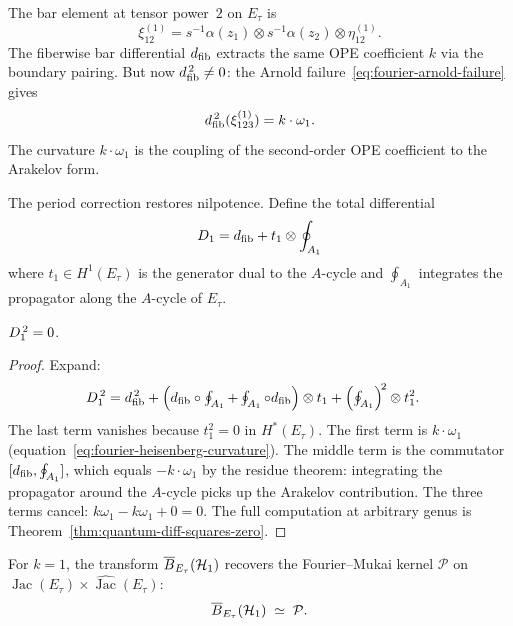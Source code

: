 \begin{computation}
\label{comp:fourier-heisenberg-elliptic}
The bar element at tensor power~$2$ on $E_\tau$ is
\[
\xi^{(1)}_{12} = s^{-1}\alpha(z_1) \otimes s^{-1}\alpha(z_2)
  \otimes \eta^{(1)}_{12}.
\]
The fiberwise bar differential $d_{\mathrm{fib}}$ extracts the same OPE
coefficient $k$ via the boundary pairing.  But now
$d_{\mathrm{fib}}^{\,2} \neq 0$: the Arnold
failure~\eqref{eq:fourier-arnold-failure} gives
\begin{equation}\label{eq:fourier-heisenberg-curvature}
d_{\mathrm{fib}}^{\,2}(\xi^{(1)}_{123}) = k \cdot \omega_1.
\end{equation}
The curvature $k \cdot \omega_1$ is the coupling of the second-order
OPE coefficient to the Arakelov form.

The period correction restores nilpotence.  Define the total
differential
\begin{equation}\label{eq:fourier-total-diff-genus1}
D_{1} = d_{\mathrm{fib}} + t_1 \otimes \oint_{A_1}
\end{equation}
where $t_1 \in H^1(E_\tau)$ is the generator dual to the $A$-cycle
and $\oint_{A_1}$ integrates the propagator along the $A$-cycle of
$E_\tau$.
\end{computation}

\begin{proposition}[\ClaimStatusProvedHere]
\label{prop:fourier-total-diff-nilpotent}
$D_{1}^{\,2} = 0$.
\end{proposition}

\begin{proof}
Expand:
\begin{align}
D_{1}^{\,2}
&= d_{\mathrm{fib}}^{\,2}
  + \left(d_{\mathrm{fib}} \circ \textstyle\oint_{A_1}
  + \textstyle\oint_{A_1} \circ d_{\mathrm{fib}}\right) \otimes t_1
  + \left(\textstyle\oint_{A_1}\right)^{\!2} \otimes t_1^2.
\label{eq:fourier-D1-squared}
\end{align}
The last term vanishes because $t_1^2 = 0$ in $H^*(E_\tau)$.  The
first term is $k \cdot \omega_1$
(equation~\eqref{eq:fourier-heisenberg-curvature}).  The middle term
is the commutator
$[d_{\mathrm{fib}}, \oint_{A_1}]$, which equals $-k \cdot \omega_1$ by the
residue theorem: integrating the propagator around the $A$-cycle
picks up the Arakelov contribution.  The three terms cancel:
$k\omega_1 - k\omega_1 + 0 = 0$.
The full computation at arbitrary genus is
Theorem~\ref{thm:quantum-diff-squares-zero}.
\end{proof}

\begin{proposition}
\label{prop:fourier-mukai-identification}
For $k = 1$, the transform $\overline{B}_{E_\tau}(\mathcal{H}_1)$ recovers
the Fourier--Mukai kernel $\mathcal{P}$ on
$\operatorname{Jac}(E_\tau) \times
\widehat{\operatorname{Jac}}(E_\tau)$:
\begin{equation}\label{eq:fourier-mukai-identification}
\overline{B}_{E_\tau}(\mathcal{H}_1) \;\simeq\; \mathcal{P}.
\end{equation}
\end{proposition}

